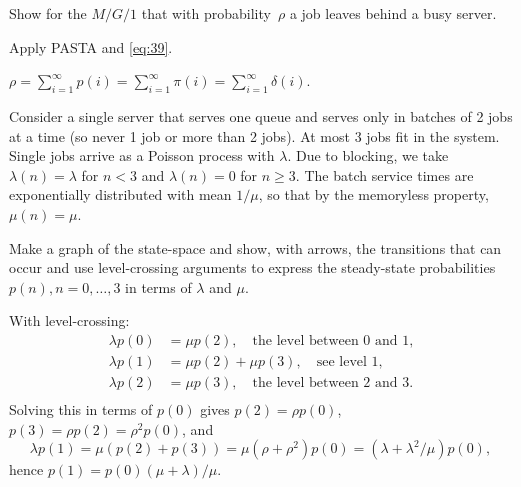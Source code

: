 \documentclass[queueing-book.tex]{subfiles}
\begin{document}
\begin{exercise}\label{ex:28}
Show for the $M/G/1$  that  with probability~$\rho$ a job leaves behind a busy server.
\begin{hint}
 Apply PASTA and \cref{eq:39}.
\end{hint}
\begin{solution}
$\rho = \sum_{i=1}^\infty p(i) = \sum_{i=1}^\infty \pi(i) = \sum_{i=1}^\infty \delta(i)$.
\end{solution}
\end{exercise}


\begin{exercise}\label{ex:67}
Consider
a single server that serves one queue and serves only in batches of 2 jobs at a time (so never 1 job or more than 2 jobs).  At most 3 jobs fit in the system.
 Single jobs arrive as a Poisson process with $\lambda$.
Due to blocking, we take $\lambda(n) = \lambda$ for $n<3$ and $\lambda(n)=0$ for $n\geq 3$.
The batch service times are exponentially distributed with mean $1/\mu$, so that  by the memoryless property, $\mu(n) = \mu$.

Make a graph of the state-space and show, with arrows, the transitions that can occur and  use level-crossing arguments to express the steady-state probabilities $p(n), n=0,\ldots, 3$ in terms of $\lambda$ and $\mu$.
\begin{solution}


With level-crossing:
 \begin{align*}
 \lambda p(0) &= \mu p(2), \quad\text{the level between 0 and 1,}\\
 \lambda p(1) &= \mu p(2) +\mu p(3), \quad\text{see level 1,}\\
 \lambda p(2) &= \mu p(3), \quad\text{the level between 2 and 3.}\\
 \end{align*}
 Solving this in terms of $p(0)$ gives $p(2) = \rho p(0)$, $p(3) = \rho p(2) = \rho^2p(0)$, and
 \begin{equation*}
 \lambda p(1) = \mu(p(2) + p(3)) = \mu (\rho + \rho^2) p(0) = (\lambda + \lambda^2/\mu) p(0),
 \end{equation*}
hence $p(1) = p(0)(\mu + \lambda)/\mu$.
\end{solution}
\end{exercise}
\end{document}
